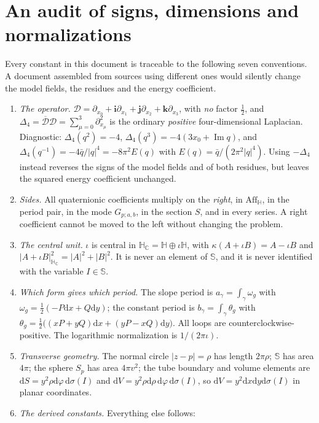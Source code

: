 \documentclass[11pt,a4paper]{article}
\numberwithin{equation}{section}
\theoremstyle{definition}
\theoremstyle{remark}
\theoremstyle{plain}
\newcommand{\HH}{\mathbb H}
\newcommand{\HC}{\mathbb H_{\mathbb C}}
\newcommand{\SSS}{\mathbb S}
\DeclareMathOperator{\Ima}{Im}
\newcommand{\Dop}{\mathcal D}
\newcommand{\lap}{\Delta_4}
\newcommand{\Aff}{\mathrm{Aff}_{\HH}}
\newcommand{\om}{\omega}
\newcommand{\thet}{\theta}
\newcommand{\Sp}{S_{p}}
\newcommand{\abs}[1]{\lvert #1\rvert}
\newcommand{\dd}{\mathrm d}
\begin{document}
\section{An audit of signs, dimensions and normalizations}
\label{f:app:audit}

Every constant in this document is traceable to the following seven
conventions. A document assembled from sources using different ones would
silently change the model fields, the residues and the energy coefficient.

\begin{enumerate}[label=\textup{(A\arabic*)}]
\item \emph{The operator.} $\Dop=\partial_{x_0}+\mathbf i\partial_{x_1}
+\mathbf j\partial_{x_2}+\mathbf k\partial_{x_3}$, with \emph{no} factor
$\tfrac12$, and $\lap=\overline{\Dop}\Dop=\sum_{\mu=0}^3\partial_{x_\mu}^2$
is the ordinary \emph{positive} four-dimensional Laplacian. Diagnostic:
$\lap(q^2)=-4$, $\lap(q^3)=-4(3x_0+\Ima q)$, and
$\lap(q^{-1})=-4\bar q/\abs q^4=-8\pi^2E(q)$ with
$E(q)=\bar q/(2\pi^2\abs q^4)$. Using $-\lap$ instead reverses the signs of
the model fields and of both residues, but leaves the squared energy
coefficient unchanged.
\item \emph{Sides.} All quaternionic coefficients multiply on the
\emph{right}, in $\Aff$, in the period pair, in the mode $G_{p;a,b}$, in
the section $S$, and in every series. A right coefficient cannot be moved
to the left without changing the problem.
\item \emph{The central unit.} $\iota$ is central in
$\HC=\HH\oplus\iota\HH$, with $\kappa(A+\iota B)=A-\iota B$ and
$\abs{A+\iota B}^2_{\HC}=\abs A^2+\abs B^2$. It is never an element of
$\SSS$, and it is never identified with the variable $I\in\SSS$.
\item \emph{Which form gives which period.} The slope period is
$a_\gamma=\int_\gamma\om_g$ with
$\om_g=\tfrac12(-P\dd x+Q\dd y)$; the constant period is
$b_\gamma=\int_\gamma\thet_g$ with
$\thet_g=\tfrac12\bigl((xP+yQ)\dd x+(yP-xQ)\dd y\bigr)$. All loops are
counterclockwise-positive. The logarithmic normalization is
$1/(2\pi\iota)$.
\item \emph{Transverse geometry.} The normal circle $\abs{z-p}=\rho$ has
length $2\pi\rho$; $\SSS$ has area $4\pi$; the sphere $\Sp$ has area
$4\pi v^2$; the tube boundary and volume elements are
$\dd S=y^2\rho\dd\varphi\,\dd\sigma(I)$ and
$\dd V=y^2\rho\dd\rho\,\dd\varphi\,\dd\sigma(I)$, so
$\dd V=y^2\dd x\dd y\dd\sigma(I)$ in planar coordinates.
\item \emph{The derived constants.} Everything else follows:

\end{enumerate}
\end{document}
